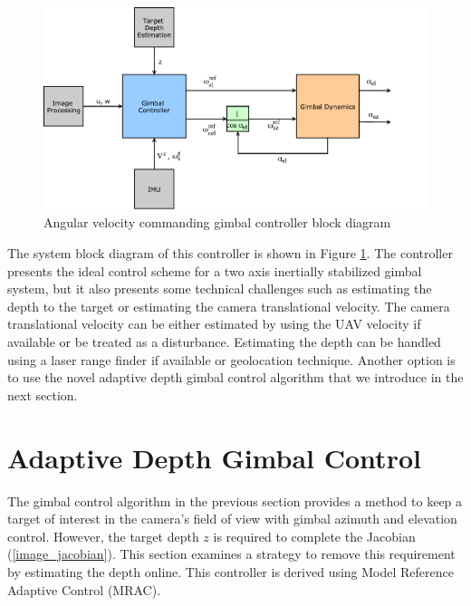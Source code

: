 \begin{figure}[htbp]
	\centering
	\includegraphics[width = 5in]{images/chapter2/gp_blockdiagram.pdf}
	\caption{Angular velocity commanding gimbal controller block diagram}
	\label{avcg_blockdiagram}
\end{figure}
The system block diagram of this controller is shown in Figure \ref{avcg_blockdiagram}. The controller presents the ideal control scheme for a two axis inertially stabilized gimbal system, but it also presents some technical challenges such as estimating the depth to the target or estimating the camera translational velocity. The camera translational velocity can be either estimated by using the UAV velocity if available or be treated as a disturbance. Estimating the depth can be handled using a laser range finder if available or geolocation technique. Another option is to use the novel adaptive depth gimbal control algorithm that we introduce in the next section.

\section{Adaptive Depth Gimbal Control}
The gimbal control algorithm in the previous section provides a method to keep a target of interest in the camera's field of view with gimbal azimuth and elevation control. However, the target depth $z$ is required to complete the Jacobian (\ref{image_jacobian}). This section examines a strategy to remove this requirement by estimating the depth online. This controller is derived using Model Reference Adaptive Control (MRAC).

